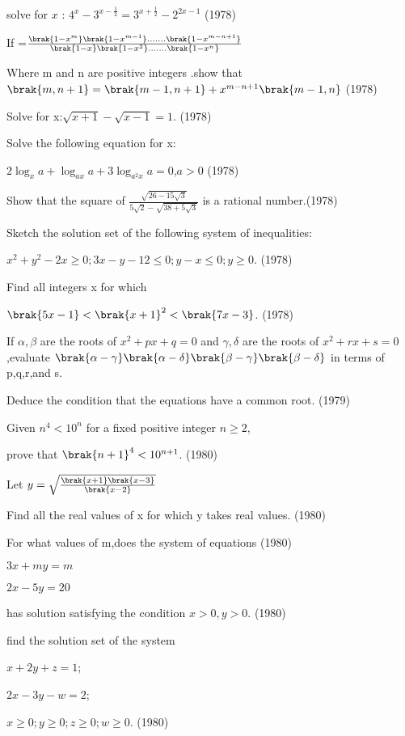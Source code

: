  \iffalse
    \title{Assignment}
    \author{AI24BTECH11024-Pappuri Prahladha}
    \section{subjective}
  \fi

     \item solve for $x$ : $4^x-3^{x-\frac{1}{2}}=3^{x+\frac{1}{2}}-2^{2x-1}$                       \hfill  (1978)

 

\item If =$\frac{\brak{1-x^m}\brak{1-x^{m-1}}.......\brak{1-x^{m-n+1}}}{\brak{1-x}\brak{1-x^2}.......\brak{1-x^n}}$

Where m and n are positive integers .show that 
$\brak{m,n+1}=\brak{m-1,n+1}+x^{m-n+1}\brak{m-1,n}$ \hfill (1978)
 \item Solve for x:$\sqrt{x+1}-\sqrt{x-1}=1$.   \hfill (1978)
 \item Solve the following equation for x:
 
$2\log_x a+\log_{ax} a+3\log_{a^2x} a=0$,$a>0$ \hfill (1978)
\item Show that the square of $\frac{\sqrt{26-15\sqrt{3}}}{5\sqrt{2}-\sqrt{38+5\sqrt{3}}}$ is a rational number.\hfill (1978) 
\item Sketch the solution set of the following system of inequalities:

$x^2+y^2-2x\geq 0;3x-y-12\leq 0;y-x\leq 0;y\geq 0$. \hfill (1978)
\item Find all integers x for which

$\brak{5x-1}<\brak{{x+1}}^2<\brak{7x-3}$. \hfill (1978)
\item If $\alpha,\beta$ are the roots of $x^2+px+q=0$ and $\gamma,\delta$ are the roots of $x^2+rx+s=0$,evaluate $\brak{\alpha-\gamma}\brak{\alpha-\delta}\brak{\beta-\gamma}\brak{\beta-\delta}$ in terms of p,q,r,and s. 

Deduce the condition that the equations have a common root. \hfill (1979)
\item Given $n^4<10^n$ for a fixed positive integer $n\geq 2$,

prove that $\brak{n+1}^4<10^{n+1}$. \hfill (1980)
\item Let $y=\sqrt{\frac{\brak{x+1}\brak{x-3}}{\brak{x-2}}}$

Find all the real values of x for which y takes real values. \hfill (1980)
\item For what values of m,does the system of equations \hfill (1980)

$3x+my=m$

$2x-5y=20$

has solution satisfying the condition $x>0,y>0$. \hfill (1980)
\item find the solution set of the system

$x+2y+z=1$;

$2x-3y-w=2$;

$x\geq 0;y\geq 0;z\geq 0;w\geq 0$.  \hfill (1980)

